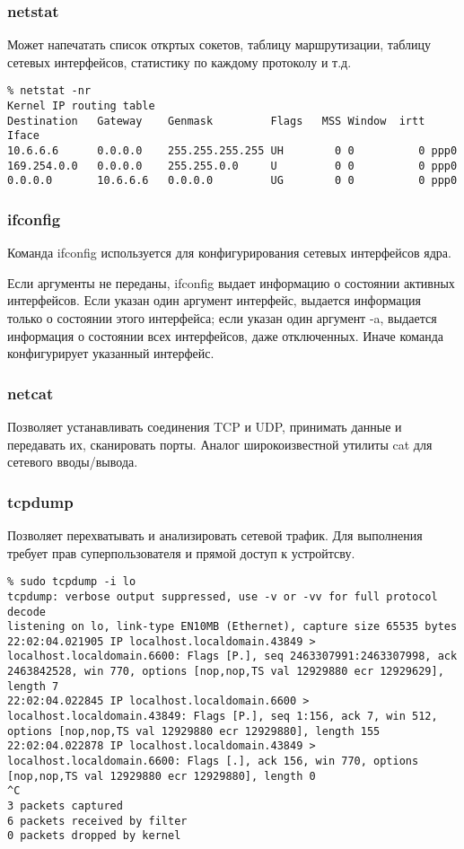 \subsubsection{netstat}
Может напечатать список откртых сокетов, таблицу маршрутизации, таблицу сетевых интерфейсов, статистику по каждому протоколу и т.д.
\lstset{language=,caption=}
\begin{lstlisting}
% netstat -nr
Kernel IP routing table
Destination   Gateway    Genmask         Flags   MSS Window  irtt Iface
10.6.6.6      0.0.0.0    255.255.255.255 UH        0 0          0 ppp0
169.254.0.0   0.0.0.0    255.255.0.0     U         0 0          0 ppp0
0.0.0.0       10.6.6.6   0.0.0.0         UG        0 0          0 ppp0
\end{lstlisting}

\subsubsection{ifconfig}
Команда ifconfig используется для конфигурирования сетевых интерфейсов ядра.

Если аргументы не переданы, ifconfig выдает информацию о состоянии активных интерфейсов. Если указан один аргумент интерфейс, выдается информация только о состоянии этого интерфейса; если указан один аргумент -a, выдается информация о состоянии всех интерфейсов, даже отключенных. Иначе команда конфигурирует указанный интерфейс.

\subsubsection{netcat}
Позволяет устанавливать соединения TCP и UDP, принимать данные и передавать их, сканировать порты. Аналог широкоизвестной утилиты cat для сетевого вводы/вывода.

\subsubsection{tcpdump}
Позволяет перехватывать и анализировать сетевой трафик. Для выполнения требует прав суперпользователя и прямой доступ к устройтсву.

\lstset{language=,caption=Типичный вывод tcpdump}
\begin{lstlisting}
% sudo tcpdump -i lo
tcpdump: verbose output suppressed, use -v or -vv for full protocol decode
listening on lo, link-type EN10MB (Ethernet), capture size 65535 bytes
22:02:04.021905 IP localhost.localdomain.43849 > localhost.localdomain.6600: Flags [P.], seq 2463307991:2463307998, ack 2463842528, win 770, options [nop,nop,TS val 12929880 ecr 12929629], length 7
22:02:04.022845 IP localhost.localdomain.6600 > localhost.localdomain.43849: Flags [P.], seq 1:156, ack 7, win 512, options [nop,nop,TS val 12929880 ecr 12929880], length 155
22:02:04.022878 IP localhost.localdomain.43849 > localhost.localdomain.6600: Flags [.], ack 156, win 770, options [nop,nop,TS val 12929880 ecr 12929880], length 0
^C
3 packets captured
6 packets received by filter
0 packets dropped by kernel
\end{lstlisting}

